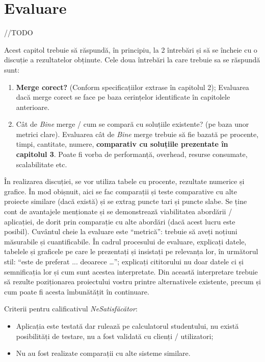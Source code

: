 \documentclass[12pt,a4paper]{report}
\begin{document}
\chapter{Evaluare}

//TODO

Acest capitol trebuie să răspundă, în principiu, la 2 întrebări și să se încheie cu o discuție a rezultatelor obținute. Cele doua întrebări la care trebuie sa se răspundă sunt:
\begin{enumerate}
	\item  \textbf{Merge corect?} (Conform specificațiilor extrase în capitolul 2);
	      Evaluarea dacă merge corect se face pe baza cerințelor identificate în capitolele anterioare.

	\item Cât de \textit{Bine} merge / cum se compară cu soluțiile existente? (pe baza unor metrici clare).
	      Evaluarea cât de \textit{Bine} merge trebuie să fie bazată pe procente, timpi, cantitate, numere, \textbf{comparativ cu soluțiile prezentate în capitolul 3}. Poate fi vorba de performanță, overhead, resurse consumate, scalabilitate etc.
\end{enumerate}

În realizarea discuției, se vor utiliza tabele cu procente, rezultate numerice și grafice. În mod obișnuit, aici se fac comparații și teste comparative cu alte proiecte similare (dacă există) și se extrag puncte tari și puncte slabe. Se ține cont de avantajele menționate și se demonstrează viabilitatea abordării / aplicației, de dorit prin comparație cu alte abordări (dacă acest lucru este posibil). Cuvântul cheie la evaluare este ``metrică'': trebuie să aveți noțiuni măsurabile și cuantificabile. În cadrul procesului de evaluare, explicați datele, tabelele și graficele pe care le prezentați și insistați pe relevanța lor, în următorul stil: ``este de preferat ... deoarece …''; explicați cititorului nu doar datele ci și semnificația lor și cum sunt acestea interpretate. Din această interpretare trebuie să rezulte poziționarea proiectului vostru printre alternativele existente, precum și cum poate fi acesta îmbunătățit în continuare.

Criterii pentru calificativul \textit{Ne\textit{Satisfăcător}}:
\begin{itemize}
	\item Aplicația este testată dar rulează pe calculatorul studentului, nu există posibilități de testare, nu a fost validată cu clienți / utilizatori;
	\item Nu au fost realizate comparații cu alte sisteme similare.
\end{itemize}
\end{document}
